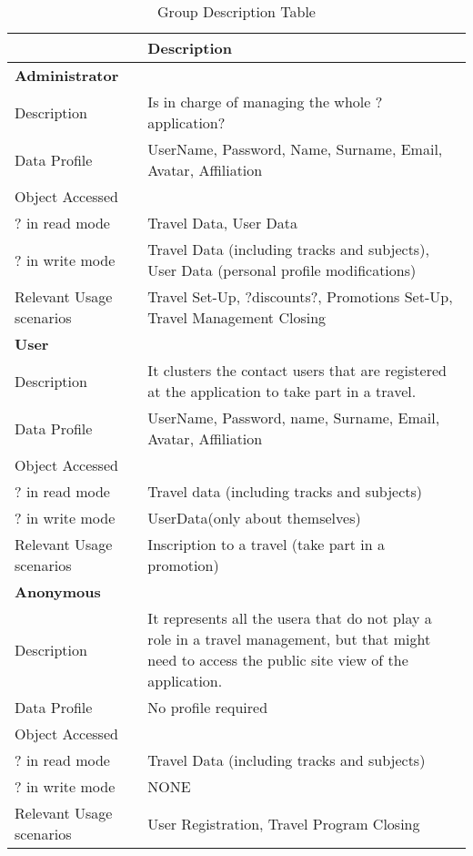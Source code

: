 \documentclass[a4paper]{memoir}
\begin{document}
		
		\begin{table}[htbp]

		\begin{tabular}{|l|l|}
		\hline
		 & \textbf{Description} \\ \hline
		\textbf{Administrator} &  \\ \hline
		Description & Is in charge of managing the whole ?application? \\ \hline
		Data Profile & UserName, Password, Name, Surname, Email, Avatar, Affiliation \\ \hline
		Object Accessed &  \\ \hline
		? in read mode & Travel Data, User Data \\ \hline
		? in write mode & Travel Data (including tracks and subjects), User Data (personal profile modifications) \\ \hline
		Relevant Usage scenarios & Travel Set-Up, ?discounts?, Promotions Set-Up, Travel Management Closing \\ \hline
		\textbf{User} &  \\ \hline
		Description & It clusters the contact users that are registered at the application to take part in a travel. \\ \hline
		Data Profile & UserName, Password, name, Surname, Email, Avatar, Affiliation \\ \hline
		Object Accessed &  \\ \hline
		? in read mode & Travel data (including tracks and subjects) \\ \hline
		? in write mode & UserData(only about themselves) \\ \hline
		Relevant Usage scenarios & Inscription to a travel (take part in a promotion) \\ \hline
		\textbf{Anonymous} &  \\ \hline
		Description & It represents all the usera that do not play a role in a travel management, but that might need to access the public site view of the application. \\ \hline
		Data Profile & No profile required \\ \hline
		Object Accessed &  \\ \hline
		? in read mode & Travel Data (including tracks and subjects) \\ \hline
		? in write mode & NONE \\ \hline
		Relevant Usage scenarios & User Registration, Travel Program Closing \\ \hline
		\end{tabular}
		
		\caption{Group Description Table}
		\label{tab:descriptionTable}
		\end{table}
		
\end{document}
